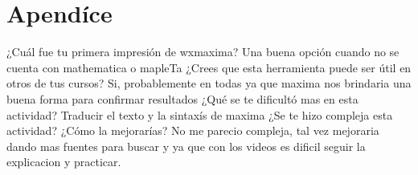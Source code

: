 \documentclass{article}
\begin{document}
\section{Apendíce}
¿Cuál fue tu primera impresión de wxmaxima?
\newline
Una buena opción cuando no se cuenta con mathematica o mapleTa
\newline
¿Crees que esta herramienta puede ser útil en otros de tus cursos?
\newline
Si, probablemente en todas ya que maxima nos brindaria una buena forma para confirmar resultados
\newline
¿Qué se te dificultó mas en esta actividad?
\newline
Traducir el texto y la sintaxís de maxima
\newline
¿Se te hizo compleja esta actividad? ¿Cómo la mejorarías? 
\newline
No me parecio compleja, tal vez mejoraria dando mas fuentes para buscar y ya que con los videos es dificil seguir la explicacion y practicar.
\end{document}
